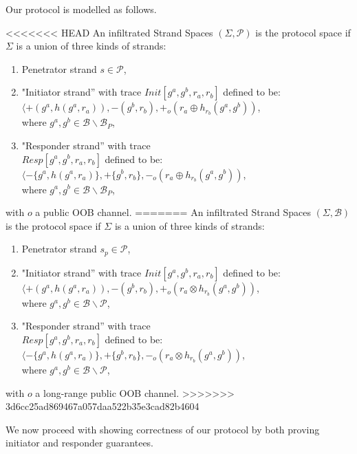 \begin{itemize}
Our protocol is modelled as follows. 

\begin{Definition}
<<<<<<< HEAD
An infiltrated Strand Spaces $(\Sigma,\mathcal{P})$ is the protocol space if $\Sigma$ is a union of three kinds of strands:
\begin{enumerate}
\item Penetrator strand $s \in \mathcal{P}$,
\item "Initiator strand'' with trace {\small $Init[g^a,g^b,r_a,r_b]$} defined to be: \\ 
 {\small $\langle +(g^a,h(g^a,r_a)),-(g^b,r_b),+_o(r_a \oplus h_{r_b}(g^a,g^b))$, \\ where $g^a,g^b \in \mathcal{B} \backslash \mathcal{B}_{P}$,}
\item "Responder strand'' with trace\\
 {\small $Resp[g^a,g^b,r_a,r_b]$} defined to be: \\ 
 {\small $\langle -\{g^a,h(g^a,r_a)\},+\{g^b,r_b\}, -_o(r_a \oplus h_{r_b}(g^a,g^b))$, \\ where $g^a,g^b \in \mathcal{B} \backslash \mathcal{B}_{P}$,}
\end{enumerate}
with $o$ a public OOB channel.
=======
An infiltrated Strand Spaces $(\Sigma,\mathcal{B})$ is the protocol space if $\Sigma$ is a union of three kinds of strands:
\begin{enumerate}
\item Penetrator strand $s_p \in \mathcal{P}$,
\item "Initiator strand'' with trace {\small $Init[g^a,g^b,r_a,r_b]$} defined to be: \\ 
 {\small $\langle +(g^a,h(g^a,r_a)),-(g^b,r_b),+_o(r_a \otimes h_{r_b}(g^a,g^b))$, \\ where $g^a,g^b \in \mathcal{B} \backslash \mathcal{P}$,}
\item "Responder strand'' with trace\\
 {\small $Resp[g^a,g^b,r_a,r_b]$} defined to be: \\ 
 {\small $\langle -\{g^a,h(g^a,r_a)\},+\{g^b,r_b\}, -_o(r_a \otimes h_{r_b}(g^a,g^b))$, \\ where $g^a,g^b \in \mathcal{B} \backslash \mathcal{P}$,}
\end{enumerate}
with $o$ a long-range public OOB channel.
>>>>>>> 3d6cc25ad869467a057daa522b35e3cad82b4604
\end{Definition}

We now proceed with showing correctness of our protocol by both proving initiator and responder guarantees.


\end{itemize}
